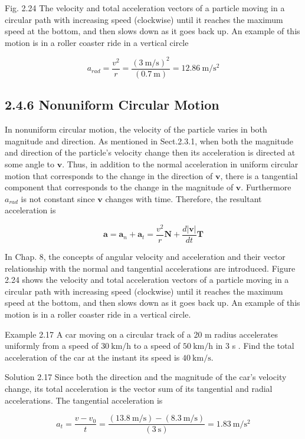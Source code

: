 \documentclass[10pt]{article}
\begin{document}
Fig. 2.24 The velocity and total acceleration vectors of a particle moving in a circular path with increasing speed (clockwise) until it reaches the maximum speed at the bottom, and then slows down as it goes back up. An example of this motion is in a roller coaster ride in a vertical circle

$$
a_{r a d}=\frac{v^{2}}{r}=\frac{(3 \mathrm{~m} / \mathrm{s})^{2}}{(0.7 \mathrm{~m})}=12.86 \mathrm{~m} / \mathrm{s}^{2}
$$

\subsection*{2.4.6 Nonuniform Circular Motion}
In nonuniform circular motion, the velocity of the particle varies in both magnitude and direction. As mentioned in Sect.2.3.1, when both the magnitude and direction of the particle's velocity change then its acceleration is directed at some angle to $\mathbf{v}$. Thus, in addition to the normal acceleration in uniform circular motion that corresponds to the change in the direction of $\mathbf{v}$, there is a tangential component that corresponds to the change in the magnitude of $\mathbf{v}$. Furthermore $a_{r a d}$ is not constant since $\mathbf{v}$ changes with time. Therefore, the resultant acceleration is

$$
\mathbf{a}=\mathbf{a}_{n}+\mathbf{a}_{t}=\frac{v^{2}}{r} \mathbf{N}+\frac{d|\mathbf{v}|}{d t} \mathbf{T}
$$

In Chap. 8, the concepts of angular velocity and acceleration and their vector relationship with the normal and tangential accelerations are introduced. Figure 2.24 shows the velocity and total acceleration vectors of a particle moving in a circular path with increasing speed (clockwise) until it reaches the maximum speed at the bottom, and then slows down as it goes back up. An example of this motion is in a roller coaster ride in a vertical circle.

Example 2.17 A car moving on a circular track of a 20 m radius accelerates uniformly from a speed of $30 \mathrm{~km} / \mathrm{h}$ to a speed of $50 \mathrm{~km} / \mathrm{h}$ in 3 s . Find the total acceleration of the car at the instant its speed is $40 \mathrm{~km} / \mathrm{s}$.

Solution 2.17 Since both the direction and the magnitude of the car's velocity change, its total acceleration is the vector sum of its tangential and radial accelerations. The tangential acceleration is

$$
a_{t}=\frac{v-v_{0}}{t}=\frac{(13.8 \mathrm{~m} / \mathrm{s})-(8.3 \mathrm{~m} / \mathrm{s})}{(3 \mathrm{~s})}=1.83 \mathrm{~m} / \mathrm{s}^{2}
$$
\end{document}
